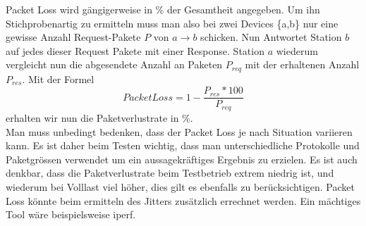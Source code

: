 \documentclass[a4,12pt]{scrartcl}
\begin{document}
\noindent Packet Loss wird gängigerweise in \% der Gesamtheit angegeben. Um ihn Stichprobenartig zu ermitteln muss man also bei zwei Devices \{a,b\} nur eine gewisse Anzahl Request-Pakete $P$ von $a \rightarrow b$ schicken. Nun Antwortet Station $b$ auf jedes dieser Request Pakete mit einer Response. Station $a$ wiederum vergleicht nun die abgesendete Anzahl an Paketen $P_{req}$ mit der erhaltenen Anzahl $P_{res}$. 
Mit der Formel
\begin{equation}
Packet Loss = 1-\frac{P_{res} * 100}{P_{req}}
\end{equation}
erhalten wir nun die Paketverlustrate in \%.\\

\noindent Man muss unbedingt bedenken, dass der Packet Loss je nach Situation variieren kann. Es ist daher beim Testen wichtig, dass man unterschiedliche Protokolle und Paketgrössen verwendet um ein aussagekräftiges Ergebnis zu erzielen. Es ist auch denkbar, dass die Paketverlustrate beim Testbetrieb extrem niedrig ist, und wiederum bei Volllast viel höher, dies gilt es ebenfalls zu berücksichtigen. Packet Loss könnte beim ermitteln des Jitters zusätzlich errechnet werden. Ein mächtiges Tool wäre beispielsweise iperf.\\
\end{document}
